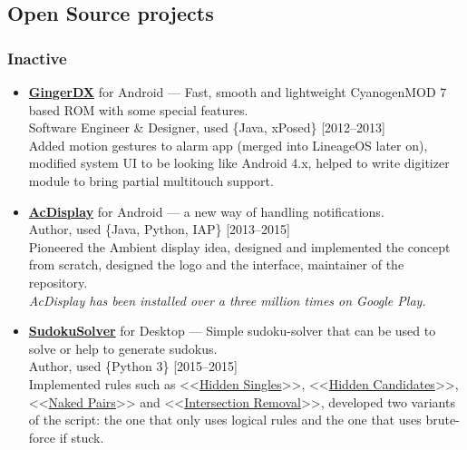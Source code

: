 \documentclass[a4paper]{article}
\begin{document}
	\subsection*{Open Source projects}
	\subsubsection*{Inactive}
	\begin{itemize}
		\item \href{https://forum.xda-developers.com/showthread.php?t=1188486}{\textbf{GingerDX}} for Android --- Fast, smooth and lightweight CyanogenMOD 7 based ROM with some special features. \\[0.2em]
		{\footnotesize Software Engineer \& Designer, used \{Java, xPosed\} \hfill [2012--2013]} \\[0.2em] 
		Added motion gestures to alarm app (merged into LineageOS later on), modified system UI to be looking like Android 4.x, helped to write digitizer module to bring partial multitouch support. 

		\item \href{http://artemchep.com/acdisplay/}{\textbf{AcDisplay}} for Android --- a new way of handling notifications. \\[0.2em]
		{\footnotesize Author, used \{Java, Python, IAP\} \hfill [2013--2015]} \\[0.2em]
		Pioneered the Ambient display idea, designed and implemented the concept from scratch, designed the logo and the interface, maintainer of the repository.\\[0.2em]
		\textit{AcDisplay has been installed over a three million times on Google Play.} 

		\item \href{https://github.com/AChep/SudokuSolver}{\textbf{SudokuSolver}} for Desktop --- Simple sudoku-solver that can be used to solve or help to generate sudokus. \\[0.2em]
		{\footnotesize Author, used \{Python 3\} \hfill [2015--2015]} \\[0.2em]
		Implemented rules such as <<\href{http://www.sudokuwiki.org/Getting_Started}{Hidden Singles}>>, <<\href{http://www.sudokuwiki.org/Hidden_Candidates}{Hidden Candidates}>>, <<\href{http://www.sudokuwiki.org/Naked_Candidates#NP}{Naked Pairs}>> and <<\href{http://www.sudokuwiki.org/intersection_removal}{Intersection Removal}>>, developed two variants of the script: the one that only uses logical rules and the one that uses brute-force if stuck.
	\end{itemize}
\end{document}

